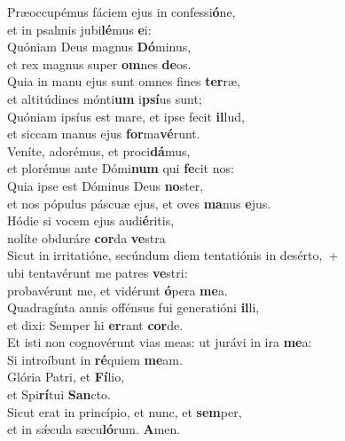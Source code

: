 \evenverse Præoccupémus fáciem ejus in confessi\textbf{ó}ne,~\*\\
\evenverse et in psalmis jubi\textbf{lé}mus \textbf{e}i:\\
\oddverse Quóniam Deus magnus \textbf{Dó}minus,~\*\\
\oddverse et rex magnus super \textbf{om}nes \textbf{de}os.\\
\evenverse Quia in manu ejus sunt omnes fines \textbf{ter}ræ,~\*\\
\evenverse et altitúdines mónti\textbf{um} i\textbf{psí}us sunt;\\
\oddverse Quóniam ipsíus est mare, et ipse fecit \textbf{il}lud,~\*\\
\oddverse et siccam manus ejus \textbf{for}ma\textbf{vé}runt.\\
\evenverse Veníte, adorémus, et proci\textbf{dá}mus,~\*\\
\evenverse et plorémus ante Dómi\textbf{num} qui \textbf{fe}cit nos:\\
\oddverse Quia ipse est Dóminus Deus \textbf{no}ster,~\*\\
\oddverse et nos pópulus páscuæ ejus, et oves \textbf{ma}nus \textbf{e}jus.\\
\evenverse Hódie si vocem ejus audi\textbf{é}ritis,~\*\\
\evenverse nolíte obduráre \textbf{cor}da \textbf{ve}stra\\
\oddverse Sicut in irritatióne, secúndum diem tentatiónis in desérto,~+\\
\oddverse  ubi tentavérunt me patres \textbf{ve}stri:~\*\\
\oddverse probavérunt me, et vidérunt \textbf{ó}pera \textbf{me}a.\\
\evenverse Quadragínta annis offénsus fui generatióni \textbf{il}li,~\*\\
\evenverse et dixi: Semper hi \textbf{er}rant \textbf{cor}de.\\
\oddverse Et isti non cognovérunt vias meas: ut jurávi in ira \textbf{me}a:~\*\\
\oddverse Si introíbunt in \textbf{ré}quiem \textbf{me}am.\\
\evenverse Glória Patri, et \textbf{Fí}lio,~\*\\
\evenverse et Spi\textbf{rí}tui \textbf{San}cto.\\
\oddverse Sicut erat in princípio, et nunc, et \textbf{sem}per,~\*\\
\oddverse et in sǽcula sæcu\textbf{ló}rum. \textbf{A}men.\\
